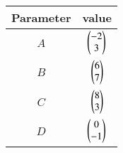 \begin{tabular}[12pt]{ |c| c|}
    \hline
    Parameter & value\\ 
    \hline
	$A$ & $\begin{pmatrix}-2\\3\end{pmatrix}$\\
    \hline 
	$B$ & $\begin{pmatrix}6\\7\end{pmatrix}$\\
    \hline
	$C$ & $\begin{pmatrix}8\\3\end{pmatrix}$\\
    \hline   
	$D$ & $\begin{pmatrix}0\\-1\end{pmatrix}$\\
    \hline
    \end{tabular}
